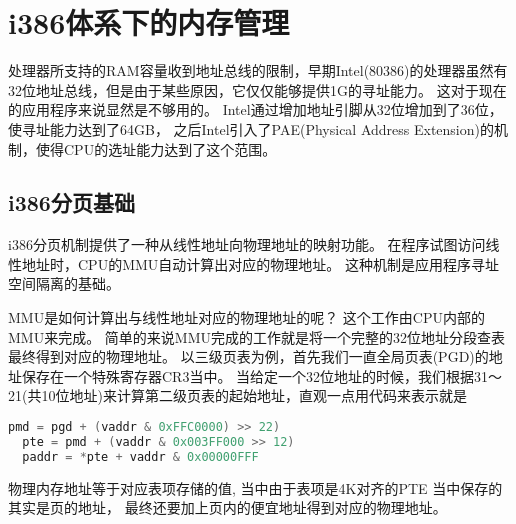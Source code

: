 \chapter{i386体系下的内存管理}

处理器所支持的RAM容量收到地址总线的限制，早期Intel(80386)的处理器虽然有32位地址总线，但是由于某些原因，它仅仅能够提供1G的寻址能力。
这对于现在的应用程序来说显然是不够用的。
Intel通过增加地址引脚从32位增加到了36位，使寻址能力达到了64GB， 之后Intel引入了PAE(Physical Address Extension)的机制，使得CPU的选址能力达到了这个范围。

\section{i386分页基础}
i386分页机制提供了一种从线性地址向物理地址的映射功能。
在程序试图访问线性地址时，CPU的MMU自动计算出对应的物理地址。 
这种机制是应用程序寻址空间隔离的基础。

MMU是如何计算出与线性地址对应的物理地址的呢？ 这个工作由CPU内部的MMU来完成。
简单的来说MMU完成的工作就是将一个完整的32位地址分段查表最终得到对应的物理地址。
以三级页表为例，首先我们一直全局页表(PGD)的地址保存在一个特殊寄存器CR3当中。
当给定一个32位地址的时候，我们根据31～21(共10位地址)来计算第二级页表的起始地址，直观一点用代码来表示就是

\begin{lstlisting}[language=C]
  pmd = pgd + (vaddr & 0xFFC0000) >> 22)
  pte = pmd + (vaddr & 0x003FF000 >> 12)
  paddr = *pte + vaddr & 0x00000FFF
\end{lstlisting}

物理内存地址等于对应表项存储的值, 当中由于表项是4K对齐的PTE 当中保存的其实是页的地址， 最终还要加上页内的便宜地址得到对应的物理地址。
